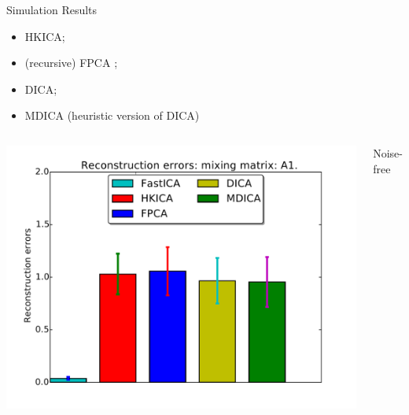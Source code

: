 \documentclass[final]{beamer} %
\newcommand{\bc}{\begin{center}}
\newcommand{\ec}{\end{center}}
\begin{document}
\begin{frame}[c]
\begin{columns}[t,totalwidth=\textwidth]
\begin{column}{0.32\textwidth}
\begin{block}{Simulation Results}
\begin{itemize}
				\item HKICA; 
				\item (recursive) FPCA \citep{vempala2014max};
				\item DICA; 
				\item MDICA (heuristic version of DICA)
			\end{itemize}
			\begin{columns}[t]
			\includegraphics[width=\textwidth]{barchart-A1-noisefree}
			\bc
			Noise-free
			\ec
			

\end{columns}
\end{block}
\end{column}
\end{columns}
\end{frame}
\end{document}
